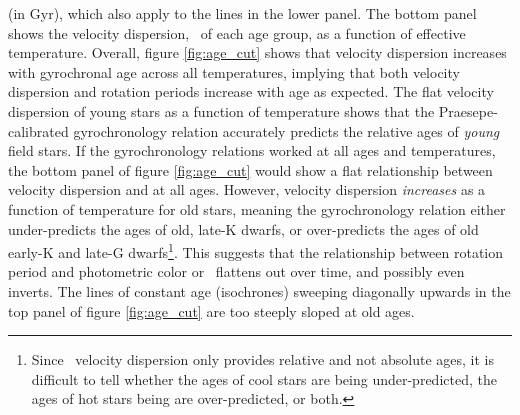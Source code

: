 (in Gyr), which also apply to the lines in the lower panel.
The bottom panel shows the velocity dispersion, \sigmavb\ of each age group,
as a function of effective temperature.
Overall, figure \ref{fig:age_cut} shows that velocity dispersion increases
with gyrochronal age across all temperatures, implying that both velocity
dispersion and rotation periods increase with age as expected.
The flat velocity dispersion of young stars as a function of temperature
shows that the Praesepe-calibrated gyrochronology relation accurately predicts
the relative ages of {\it young} field stars.
If the gyrochronology relations worked at all ages and temperatures, the
bottom panel of figure \ref{fig:age_cut} would show a flat relationship
between velocity dispersion and \teff at all ages.
However, velocity dispersion {\it increases} as a function of temperature for
old stars, meaning the \citet{angus2019} gyrochronology relation either
under-predicts the ages of old, late-K dwarfs, or over-predicts the ages of
old early-K and late-G dwarfs\footnote{Since \vb\ velocity dispersion only
provides relative and not absolute ages, it is difficult to tell whether the
ages of cool stars are being under-predicted, the ages of hot stars being are
over-predicted, or both.}.
This suggests that the relationship between rotation period and photometric
color or \teff\ flattens out over time, and possibly even inverts.
The lines of constant age (isochrones) sweeping diagonally upwards in the top
panel of figure \ref{fig:age_cut} are too steeply sloped at old ages.

